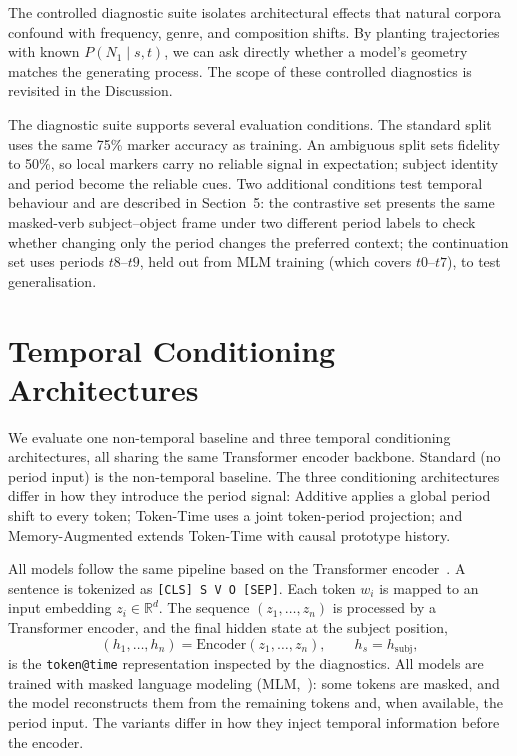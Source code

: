 \documentclass[runningheads]{llncs}
\begin{document}
The controlled diagnostic suite isolates architectural effects that natural
corpora confound with frequency, genre, and composition shifts. By planting
trajectories with known \(P(N_1 \mid s, t)\), we can ask directly whether a
model's geometry matches the generating process. The scope of these controlled
diagnostics is revisited in the Discussion.

The diagnostic suite supports several evaluation conditions. The standard split uses
the same 75\% marker accuracy as training. An ambiguous split sets
fidelity to 50\%, so local markers carry no reliable signal in expectation; subject
identity and period become the reliable cues. Two additional conditions test temporal behaviour
and are described in Section~5: the contrastive set presents the same
masked-verb subject--object frame under two different period labels to check whether changing only the
period changes the preferred context; the continuation set uses periods \(t8\)--\(t9\), held out from MLM training
(which covers \(t0\)--\(t7\)), to test generalisation.

\section{Temporal Conditioning Architectures}
We evaluate one non-temporal baseline and three temporal conditioning architectures,
all sharing the same Transformer encoder backbone. Standard (no period input) is
the non-temporal baseline. The three conditioning architectures differ in how
they introduce the period signal: Additive applies a global period shift to every
token; Token-Time uses a joint token-period projection; and Memory-Augmented
extends Token-Time with causal prototype history.

All models follow the same pipeline based on the Transformer
encoder~\cite{vaswani2017attention}. A sentence is tokenized as
\texttt{[CLS] S V O [SEP]}. Each token \(w_i\) is mapped to an input embedding
\(z_i \in \mathbb{R}^d\). The sequence \((z_1,\ldots,z_n)\) is processed by a
Transformer encoder, and the final hidden state at the subject position,
\[
  (h_1,\ldots,h_n) = \mathrm{Encoder}(z_1,\ldots,z_n),
  \qquad h_s = h_{\mathrm{subj}},
\]
is the \texttt{token@time} representation inspected by the diagnostics. All
models are trained with masked language modeling
(MLM,~\cite{devlin2019bert}): some tokens are masked, and the model reconstructs
them from the remaining tokens and, when available, the period input. The
variants differ in how they inject temporal information before the encoder.
\end{document}
